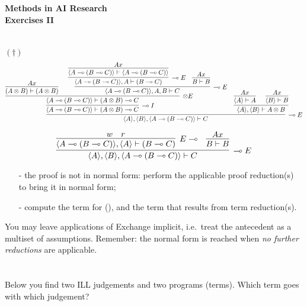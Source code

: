 \documentclass[11pt]{article}
\newcommand{\nd}[2]{#1 \vdash #2}
\newcommand{\Zip}[1]{\langle #1 \rangle}
\newcommand{\lolli}{\multimap}
\begin{document}
\setlength{\unitlength}{1cm}

\begin{center}
{\bf Methods in AI Research} \\
\vskip5pt 
{\bf Exercises II} \\
\vskip5pt 
\end{center}

\section{}
\begin{small}
$(\dag)\qquad$ 
\[
\infer[\lolli E]{\nd{\Zip{A},\Zip{B},\Zip{A\lolli (B\lolli C)}}{C}}
{\infer[\lolli I]{\nd{\Zip{A\lolli (B\lolli C)}}{(A\otimes B)\lolli C}}
{\infer[\otimes E]{\nd{\Zip{A \lolli (B \lolli C)}}{(A \otimes B)\lolli C}}{{\infer[]{\nd{(A \otimes B)}{(A \otimes B)}}{Ax}} & 
{\infer[\lolli E]{\nd{\Zip{A \lolli (B \lolli C)},{A},{B}}{C}}{
{\infer[\lolli E]{\nd{\Zip{A \lolli (B \lolli C)},A}{(B \lolli C)}}
{\infer[]{\nd{\Zip{A\lolli(B \lolli C)}}{\Zip{A \lolli (B \lolli C)}}}{Ax}}}
&{\infer[]{\nd{B}{B}}{Ax}}}}}} &
\infer[]{\nd{\Zip{A},\Zip{B}}{A\otimes B}}
{{\infer[]{\nd{\Zip{A}}{A}}{Ax}} &
{\infer[]{\nd{\Zip{B}}{B}}{Ax}}}}
\]

\[
\infer[\lolli E]{\nd{\Zip{A},\Zip{B},\Zip{A \lolli (B \lolli C)}}{C}}
{{\infer[E \lolli]{\nd{\Zip{A \lolli (B \lolli C)},\Zip{A}}{(B \lolli C)}}{{w}&{r}}}&
{\infer[]{\nd{B}{B}}{Ax}}}
\]
\end{small}
\begin{itemize}
  
  \item[-] the proof is not in normal form: perform the applicable
  proof reduction(s) to bring it in normal form;
  \item[-] compute the term for (\dag), and the term that results from term reduction(s).
\end{itemize}
You may leave applications of Exchange implicit, i.e.~treat the antecedent as
a multiset of assumptions. Remember: the normal form is reached when \emph{no further
reductions} are applicable.


\section{}
Below you find two ILL judgements and two programs (terms). Which 
term goes with which judgement?
\end{document}
